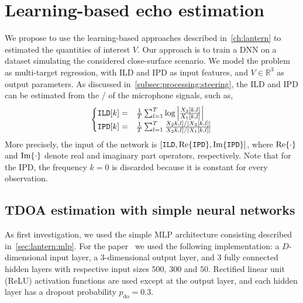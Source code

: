 \section{Learning-based echo estimation}
We propose to use the learning-based approaches described in~\cref{ch:lantern} to estimated the quantities of interest $V$.
Our approach is to train a \ac{DNN} on a dataset simulating the considered close-surface scenario.
We model the problem as multi-target regression, with \acf{ILD} and \acf{IPD} as input features, and $V \in \mathbb{R}^3$ as output parameters.
As discussed in~\cref{subsec:processing:steering}, the \ac{ILD} and \ac{IPD} can be estimated from the \STFT/ of the microphone signals, such as,
\begin{equation} \label{eq:mirage:features}
\begin{cases}
\ild[k]  =& \tfrac{1}{T} \sum_{l=1}^T \log{\abs{\frac{\MIC_2[k,l]}{\MIC_1[k,l]}}} \\
\ipd[k]  =& \tfrac{1}{T} \sum_{l=1}^T \frac{\MIC_2k,l]/ \abs{\MIC_2[k,l]}}{ \MIC_2k,l] / \abs{\MIC_1[k,l]}}\\
\end{cases}
\end{equation}
More precisely, the input of the network is $\klist{ \ild, \kRe\set{\ipd}, \kIm\set{\ipd}}$, where $\kRe\set{\cdot}$ and $\kIm\set{\cdot}$ denote real and imaginary part operators, respectively.
Note that for the \ac{IPD}, the frequency $k=0$ is discarded because it is constant for every observation.


\subsection{TDOA estimation with simple neural networks}
As first investigation, we used the simple \ac{MLP} architecture consisting described in~\cref{sec:lantern:mlp}.
For the paper~ we used the following implementation:
a $D$-dimensional input layer, a 3-dimensional output layer, and 3 fully connected hidden layers with respective input sizes $500$, $300$ and $50$.
Rectified linear unit (ReLU) activation functions are used except at the output layer, and each hidden layer has a dropout probability $p_\text{do} = 0.3$.

